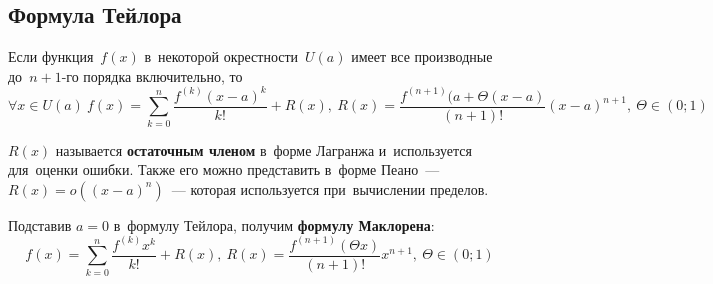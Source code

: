 \subsection{Формула Тейлора}
\begin{theorem}
\label{th:Taylor's_formula}
Если функция~$f(x)$ в~некоторой окрестности~$U(a)$ имеет все производные до~$n + 1$\nobreakdash-го порядка включительно, то
\begin{equation*}
\forall x \in U(a) \ f(x) = \sum_{k=0}^n \frac{f^{(k)} (x - a)^k}{k!} + R(x), \ R(x) = \frac{f^{(n + 1)}(a + \Theta(x - a)}{(n + 1)!}(x - a)^{n + 1}, \ \Theta \in (0; 1)
\end{equation*}
\end{theorem}

$R(x)$ называется \textbf{остаточным членом} в~форме Лагранжа и~используется для~оценки ошибки. Также его можно представить в~форме Пеано~--- $R(x) = o((x - a)^n)$~--- которая используется при~вычислении пределов.

Подставив $a = 0$ в~формулу Тейлора, получим \textbf{формулу Маклорена}:
\begin{equation*}
f(x) = \sum_{k=0}^n \frac{f^{(k)} x^k}{k!} + R(x), \ R(x) = \frac{f^{(n + 1)}(\Theta x)}{(n + 1)!} x^{n + 1}, \ \Theta \in (0; 1)
\end{equation*}

